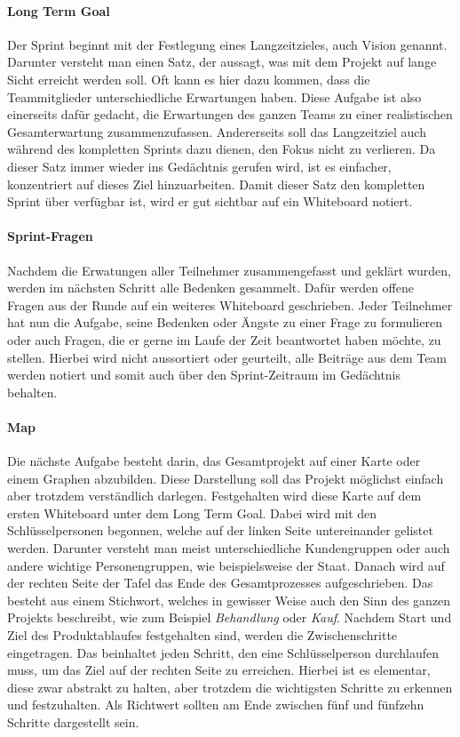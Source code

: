 \paragraph{Long Term Goal}
\label{sec:Sprint-Tag1-LTG}
Der Sprint beginnt mit der Festlegung eines Langzeitzieles, auch Vision genannt. Darunter versteht man einen Satz, der aussagt, was mit dem Projekt auf lange Sicht erreicht werden soll. Oft kann es hier dazu kommen, dass die Teammitglieder unterschiedliche Erwartungen haben. Diese Aufgabe ist also einerseits dafür gedacht, die Erwartungen des ganzen Teams zu einer realistischen Gesamterwartung zusammenzufassen. Andererseits soll das Langzeitziel auch während des kompletten Sprints dazu dienen, den Fokus nicht zu verlieren. Da dieser Satz immer wieder ins Gedächtnis gerufen wird, ist es einfacher, konzentriert auf dieses Ziel hinzuarbeiten. Damit dieser Satz den kompletten Sprint über verfügbar ist, wird er gut sichtbar auf ein Whiteboard notiert. 

\paragraph{Sprint-Fragen}
\label{sec:Sprint-Tag1-Fragen}
Nachdem die Erwatungen aller Teilnehmer zusammengefasst und geklärt wurden, werden im nächsten Schritt alle Bedenken gesammelt. Dafür werden offene Fragen aus der Runde auf ein weiteres Whiteboard geschrieben. Jeder Teilnehmer hat nun die Aufgabe, seine Bedenken oder Ängste zu einer Frage zu formulieren oder auch Fragen, die er gerne im Laufe der Zeit beantwortet haben möchte, zu stellen. Hierbei wird nicht aussortiert oder geurteilt, alle Beiträge aus dem Team werden notiert und somit auch über den Sprint-Zeitraum im Gedächtnis behalten. 

\paragraph{Map}
\label{sec:Sprint-Tag1-Map}
Die nächste Aufgabe besteht darin, das Gesamtprojekt auf einer Karte oder einem Graphen abzubilden. Diese Darstellung soll das Projekt möglichst einfach aber trotzdem verständlich darlegen. Festgehalten wird diese Karte auf dem ersten Whiteboard unter dem Long Term Goal. Dabei wird mit den Schlüsselpersonen begonnen, welche auf der linken Seite untereinander gelistet werden. Darunter versteht man meist unterschiedliche Kundengruppen oder auch andere wichtige Personengruppen, wie beispielsweise der Staat. Danach wird auf der rechten Seite der Tafel das Ende des Gesamtprozesses aufgeschrieben. Das besteht aus einem Stichwort, welches in gewisser Weise auch den Sinn des ganzen Projekts beschreibt, wie zum Beispiel \textit{Behandlung} oder \textit{Kauf}. Nachdem Start und Ziel des Produktablaufes festgehalten sind, werden die Zwischenschritte eingetragen. Das beinhaltet jeden Schritt, den eine Schlüsselperson durchlaufen muss, um das Ziel auf der rechten Seite zu erreichen. Hierbei ist es elementar, diese zwar abstrakt zu halten, aber trotzdem die wichtigsten Schritte zu erkennen und festzuhalten. Als Richtwert sollten am Ende zwischen fünf und fünfzehn Schritte dargestellt sein.


